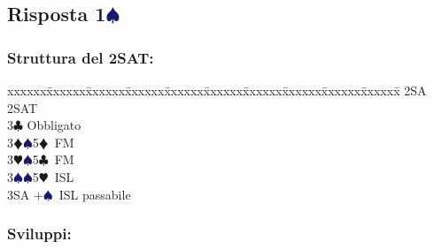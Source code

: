 \documentclass[a4paper,italian]{article}
\newcommand{\BC}{\textcolor{OliveGreen}{$\clubsuit$}}
\newcommand{\BD}{\textcolor{RedOrange}{$\vardiamondsuit$}}
\newcommand{\BH}{\textcolor{Red2}{$\varheartsuit${}}}
\newcommand{\BS}{\textcolor{MidnightBlue}{$\spadesuit${}}}
\newcommand{\pdfs}{\texorpdfstring{\BS{}}{S}}
\newenvironment{bidtable}
{\begin{tabbing}

    xxxxxx\=xxxxxx\=xxxxxx\=xxxxxx\=xxxxxx\=xxxxxx\=xxxxxx\=xxxxxx\=xxxxxx\=xxxxxx\=\kill}
{\end{tabbing} }%
\begin{document}
\begin{multicols}{2}
    \subsection{Risposta 1\pdfs}

    \subsubsection{Struttura del 2SAT:}

    \begin{bidtable}
        2SA \> 2SAT\+\\
        3\BC \> Obbligato\+\\
        3\BD {}\BS 5\BD\ FM\\
        3\BH {}\BS 5\BC\ FM\\
        3\BS {}\BS 5\BH\ ISL\\
        3SA +\BS\ ISL passabile\-\-
    \end{bidtable}

    \subsubsection{Sviluppi:}


\end{multicols}
\end{document}
